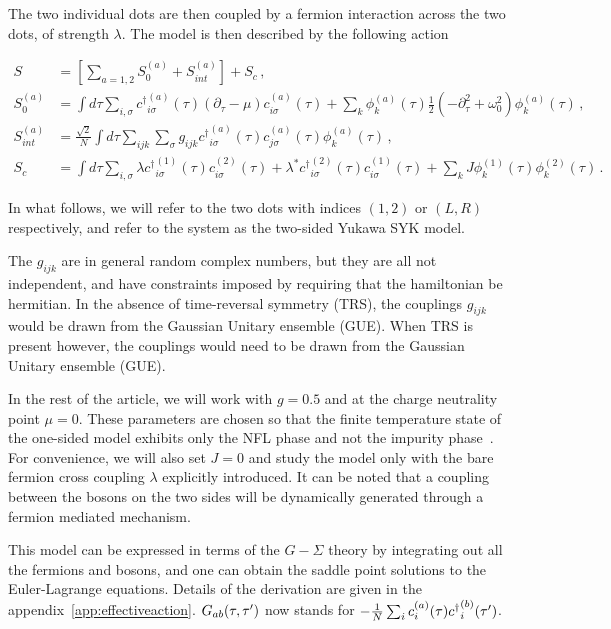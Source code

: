 The two individual dots are then coupled by a fermion interaction across the two dots, of strength $\lambda$. The model is then described by the following action
\begin{widetext}    
\begin{align}
    S &= \left[\sum_{a=1,2} S^{(a)}_0 + S^{(a)}_{int}\right] + S_c \, , \nonumber \\
    S^{(a)}_{0} &= \int d\tau \sum_{i,\sigma} {c^\dagger}^{(a)}_{i\sigma}(\tau) \left(\partial_\tau - \mu\right)c^{(a)}_{i\sigma}(\tau) + \sum_k \phi^{(a)}_k(\tau)\frac{1}{2}\left(-\partial_\tau^2 + \omega_0^2\right) \phi^{(a)}_k(\tau) \, ,\nonumber\\
    S^{(a)}_{int} &= \frac{\sqrt{2}}{N}\int d\tau \sum_{ijk}\sum_{\sigma}  g_{ijk}{c^\dagger}^{(a)}_{i\sigma}(\tau)c^{(a)}_{j\sigma}(\tau)\phi^{(a)}_k(\tau) \, ,\nonumber\\
    S_c &= \int d\tau \sum_{i,\sigma}\lambda {c^\dagger}^{(1)}_{i\sigma}(\tau)c^{(2)}_{i\sigma}(\tau) + \lambda^* {c^\dagger}^{(2)}_{i\sigma}(\tau)c^{(1)}_{i\sigma}(\tau) + \sum_k J\phi^{(1)}_k(\tau)\phi^{(2)}_k(\tau) \,.
    \label{eq:bareaction}
\end{align}
\end{widetext}
In what follows, we will refer to the two dots with indices $(1,2)$ or $(L,R)$ respectively, and refer to the system as the two-sided Yukawa SYK model. 

The $g_{ijk}$ are in general random complex numbers, but they are all not independent, and have constraints imposed by requiring that the hamiltonian be hermitian. In the absence of time-reversal symmetry (TRS), the couplings $g_{ijk}$ would be drawn from the Gaussian Unitary ensemble (GUE). When TRS is present however, the couplings would need to be drawn from the Gaussian Unitary ensemble (GUE). 

In the rest of the article, we will work with $g=0.5$ and at the charge neutrality point $\mu=0$. These parameters are chosen so that the finite temperature state of the one-sided model exhibits only the NFL phase and not the impurity phase~\cite{esterlis2019cooper}. For convenience, we will also set $J=0$ and study the model only with the bare fermion cross coupling $\lambda$ explicitly introduced. It can be noted that a coupling between the bosons on the two sides will be dynamically generated through a fermion mediated mechanism.

This model can be expressed in terms of the $G-\Sigma$ theory by integrating out all the fermions and bosons, and one can obtain the saddle point solutions to the Euler-Lagrange equations. Details of the derivation are given in the appendix~\ref{app:effectiveaction}. 
$G_{ab}(\tau,\tau^\prime)$ now stands for $-\frac{1}{N} \sum_ic^{(a)}_{i}(\tau){c^\dagger}^{(b)}_{i}(\tau^\prime)$. 


